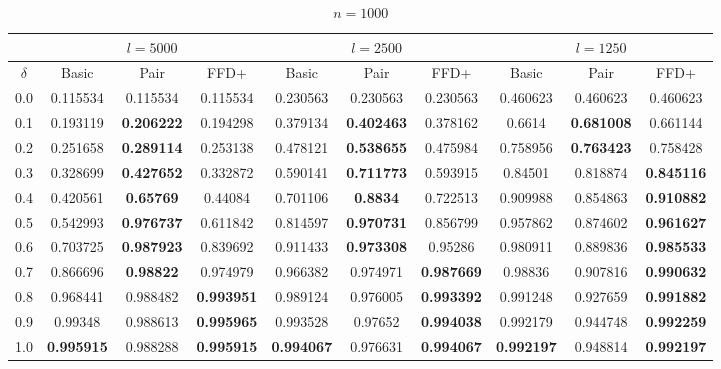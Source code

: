 \documentclass[oribibl]{llncs}
\begin{document}
\begin{table}[!htb]
	\centering
	\caption{$n = 1000$}
	\begin{tabular}{c@{\hspace{15pt}}c@{\hspace{10pt}}c@{\hspace{10pt}}c@{\hspace{7pt}}| @{\hspace{7pt}}c@{\hspace{10pt}}c@{\hspace{10pt}}c@{\hspace{7pt}}| @{\hspace{7pt}} c@{\hspace{10pt}}c@{\hspace{10pt}}c}
		\noalign{\smallskip}
		& \multicolumn{3}{c}{$l = 5000$} & \multicolumn{3}{c}{$l = 2500$} & \multicolumn{3}{c}{$l = 1250$} \\
		\hline\noalign{\smallskip}
		$\delta$ & Basic & Pair & FFD+ & Basic & Pair & FFD+ & Basic & Pair & FFD+ \\
		\noalign{\smallskip}
		\hline
		\noalign{\smallskip}
		0.0	&0.115534&	0.115534&	0.115534&	0.230563&	0.230563&	0.230563&	0.460623&	0.460623&	0.460623 \\
		0.1	&0.193119&	\textbf{0.206222} &	0.194298&	0.379134&	\textbf{0.402463}&	0.378162&	0.6614&	\textbf{0.681008}&	0.661144 \\
		0.2	&0.251658&	\textbf{0.289114} &	0.253138&	0.478121&	\textbf{0.538655}&	0.475984&	0.758956&	\textbf{0.763423}&	0.758428 \\
		0.3	&0.328699&	\textbf{0.427652} &	0.332872&	0.590141&	\textbf{0.711773}&	0.593915&	0.84501&	0.818874&	\textbf{0.845116} \\
		0.4	&0.420561&	\textbf{0.65769} &	0.44084&	0.701106&	\textbf{0.8834}&	0.722513&	0.909988&	0.854863&	\textbf{0.910882} \\
		0.5	&0.542993&	\textbf{0.976737} &	0.611842&	0.814597&	\textbf{0.970731}&	0.856799&	0.957862&	0.874602&	\textbf{0.961627} \\
		0.6	&0.703725&	\textbf{0.987923} &	0.839692&	0.911433&	\textbf{0.973308}&	0.95286&	0.980911&	0.889836&	\textbf{0.985533} \\
		0.7	&0.866696&	\textbf{0.98822} 	& 0.974979&	0.966382&	0.974971&	\textbf{0.987669}&	0.98836&	0.907816&	\textbf{0.990632} \\
		0.8	&0.968441&	0.988482& \textbf{0.993951} &	0.989124&	0.976005&	\textbf{0.993392}&	0.991248&	0.927659&	\textbf{0.991882} \\
		0.9	&0.99348&	0.988613& \textbf{0.995965} &	0.993528&	0.97652&	\textbf{0.994038}&	0.992179&	0.944748&	\textbf{0.992259} \\
		1.0	& \textbf{0.995915} & 0.988288&	\textbf{0.995915} &	\textbf{0.994067}&	0.976631&	\textbf{0.994067}&	\textbf{0.992197}&	0.948814&	\textbf{0.992197} \\
		\hline
	\end{tabular}
	\label{table:n1000}
\end{table}	
\end{document}
